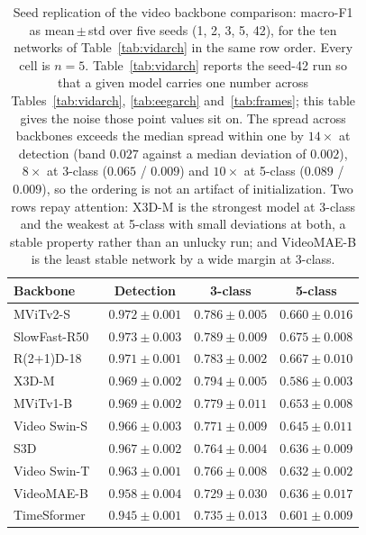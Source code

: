 \begin{table}[!ht]
\centering
\caption{Seed replication of the video backbone comparison: macro-F1 as
mean\,$\pm$\,std over five seeds (1, 2, 3, 5, 42), for the ten networks of
Table~\ref{tab:vidarch} in the same row order. Every cell is $n{=}5$.
Table~\ref{tab:vidarch} reports the seed-42 run so that a given model carries one
number across Tables~\ref{tab:vidarch}, \ref{tab:eegarch} and~\ref{tab:frames}; this
table gives the noise those point values sit on. The spread across backbones exceeds the
median spread within one by $14\times$ at detection (band $0.027$ against a median
deviation of $0.002$), $8\times$ at 3-class ($0.065$ / $0.009$) and $10\times$ at
5-class ($0.089$ / $0.009$), so the ordering is not an artifact of initialization. Two
rows repay attention: X3D-M is the strongest model at 3-class and the weakest at 5-class
with small deviations at both, a stable property rather than an unlucky run; and
VideoMAE-B is the least stable network by a wide margin at 3-class.}
\label{tab:vidarchseeds}
\setlength{\tabcolsep}{7pt}
\renewcommand{\arraystretch}{1.12}
\begin{tabular}{@{}l ccc@{}}
\toprule
\textbf{Backbone} & \textbf{Detection} & \textbf{3-class} & \textbf{5-class} \\
\midrule
MViTv2-S~\cite{li2022mvitv2} & $0.972\pm0.001$ & $0.786\pm0.005$ & $0.660\pm0.016$ \\
SlowFast-R50~\cite{feichtenhofer2019slowfast} & $0.973\pm0.003$ & $0.789\pm0.009$ & $0.675\pm0.008$ \\
R(2+1)D-18~\cite{tran2018r2plus1d} & $0.971\pm0.001$ & $0.783\pm0.002$ & $0.667\pm0.010$ \\
X3D-M~\cite{feichtenhofer2020x3d} & $0.969\pm0.002$ & $0.794\pm0.005$ & $0.586\pm0.003$ \\
MViTv1-B~\cite{fan2021mvit} & $0.969\pm0.002$ & $0.779\pm0.011$ & $0.653\pm0.008$ \\
Video Swin-S~\cite{liu2022videoswin} & $0.966\pm0.003$ & $0.771\pm0.009$ & $0.645\pm0.011$ \\
S3D~\cite{xie2018s3d} & $0.967\pm0.002$ & $0.764\pm0.004$ & $0.636\pm0.009$ \\
Video Swin-T~\cite{liu2022videoswin} & $0.963\pm0.001$ & $0.766\pm0.008$ & $0.632\pm0.002$ \\
VideoMAE-B~\cite{tong2022videomae} & $0.958\pm0.004$ & $0.729\pm0.030$ & $0.636\pm0.017$ \\
TimeSformer~\cite{bertasius2021timesformer} & $0.945\pm0.001$ & $0.735\pm0.013$ & $0.601\pm0.009$ \\
\bottomrule
\end{tabular}
\end{table}

